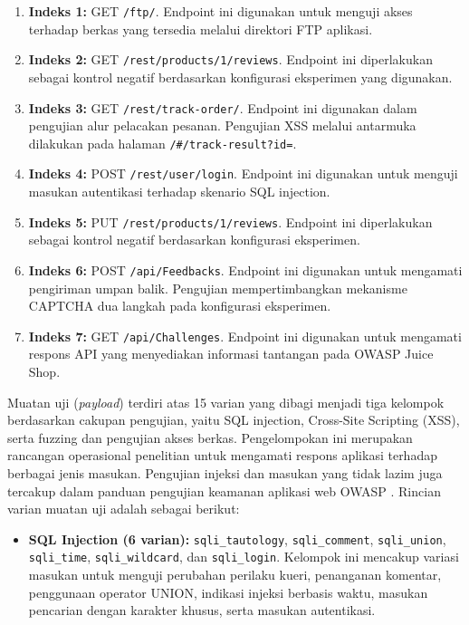 \begin{enumerate}
\begin{enumerate}
    \item \textbf{Indeks 1:} GET \texttt{/ftp/}. Endpoint ini
    digunakan untuk menguji akses terhadap berkas yang tersedia
    melalui direktori FTP aplikasi.

    \item \textbf{Indeks 2:} GET
    \texttt{/rest/products/1/reviews}. Endpoint ini diperlakukan
    sebagai kontrol negatif berdasarkan konfigurasi eksperimen
    yang digunakan.

    \item \textbf{Indeks 3:} GET \texttt{/rest/track-order/}.
    Endpoint ini digunakan dalam pengujian alur pelacakan pesanan.
    Pengujian XSS melalui antarmuka dilakukan pada halaman
    \texttt{/\#/track-result?id=}.

    \item \textbf{Indeks 4:} POST \texttt{/rest/user/login}.
    Endpoint ini digunakan untuk menguji masukan autentikasi
    terhadap skenario SQL injection.

    \item \textbf{Indeks 5:} PUT
    \texttt{/rest/products/1/reviews}. Endpoint ini diperlakukan
    sebagai kontrol negatif berdasarkan konfigurasi eksperimen.

    \item \textbf{Indeks 6:} POST \texttt{/api/Feedbacks}.
    Endpoint ini digunakan untuk mengamati pengiriman umpan balik.
    Pengujian mempertimbangkan mekanisme CAPTCHA dua langkah
    pada konfigurasi eksperimen.

    \item \textbf{Indeks 7:} GET \texttt{/api/Challenges}.
    Endpoint ini digunakan untuk mengamati respons API yang
    menyediakan informasi tantangan pada OWASP Juice Shop.
\end{enumerate}

Muatan uji (\textit{payload}) terdiri atas 15 varian yang dibagi
menjadi tiga kelompok berdasarkan cakupan pengujian, yaitu SQL
injection, Cross-Site Scripting (XSS), serta fuzzing dan pengujian
akses berkas. Pengelompokan ini merupakan rancangan operasional
penelitian untuk mengamati respons aplikasi terhadap berbagai
jenis masukan. Pengujian injeksi dan masukan yang tidak lazim
juga tercakup dalam panduan pengujian keamanan aplikasi web OWASP
\cite{owaspWSTG}. Rincian varian muatan uji adalah sebagai berikut:

\begin{itemize}
    \item \textbf{SQL Injection (6 varian):}
    \texttt{sqli\_tautology},
    \texttt{sqli\_comment},
    \texttt{sqli\_union},
    \texttt{sqli\_time},
    \texttt{sqli\_wildcard}, dan
    \texttt{sqli\_login}. Kelompok ini mencakup variasi masukan
    untuk menguji perubahan perilaku kueri, penanganan komentar,
    penggunaan operator UNION, indikasi injeksi berbasis waktu,
    masukan pencarian dengan karakter khusus, serta masukan
    autentikasi.


\end{itemize}
\end{enumerate}
